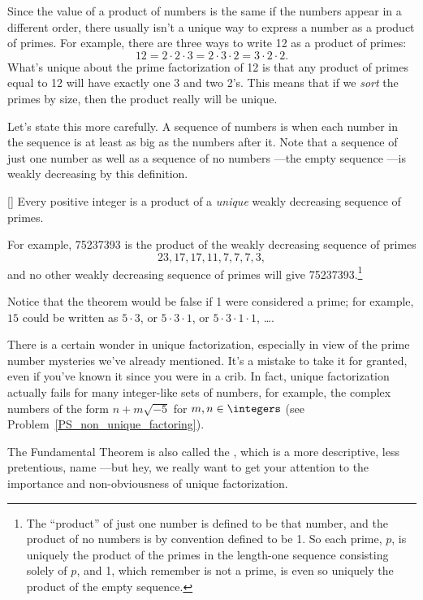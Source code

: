 Since the value of a product of numbers is the same if the numbers
appear in a different order, there usually isn't a unique way to
express a number as a product of primes.  For example, there are three
ways to write 12 as a product of primes:
\[
12 = 2 \cdot 2 \cdot 3 = 2 \cdot 3 \cdot 2 = 3 \cdot 2 \cdot 2.
\]
What's unique about the prime factorization of 12 is that any product
of primes equal to 12 will have exactly one 3 and two 2's.  This means
that if we \emph{sort} the primes by size, then the product really
will be unique.

Let's state this more carefully.  A sequence of numbers is
\emph{} when each number in the sequence is at
least as big as the numbers after it.  Note that a sequence of just
one number as well as a sequence of no numbers ---the empty sequence
---is weakly decreasing by this definition.

\begin{theorem}\label{thm:unique_factor}[]
Every positive integer is a product of a \emph{unique} weakly
decreasing sequence of primes.
\end{theorem}

For example, 75237393 is the product of the weakly decreasing sequence
of primes
\[
23, 17, 17, 11, 7, 7, 7, 3,
\]
and no other weakly decreasing sequence of primes will give
75237393.\footnote{The ``product'' of just one number is defined to be
  that number, and the product of no numbers is by convention defined
  to be 1.  So each prime, $p$, is uniquely the product of the primes
  in the length-one sequence consisting solely of $p$, and 1, which
  remember is not a prime, is even so uniquely the product of the
  empty sequence.}

Notice that the theorem would be false if 1 were considered a prime;
for example, $15$ could be written as $5 \cdot 3$, or $5 \cdot 3 \cdot
1$, or $5 \cdot 3 \cdot 1 \cdot 1$, \dots.

There is a certain wonder in unique factorization, especially in view
of the prime number mysteries we've already mentioned.  It's a mistake
to take it for granted, even if you've known it since you were in a
crib.  In fact, unique factorization actually fails for many
integer-like sets of numbers, for example, the complex numbers of the
form $n + m\sqrt{-5}$ for $m,n \in \integers$ (see
Problem~\ref{PS_non_unique_factoring}).

The Fundamental Theorem is also called the , which is a more descriptive, less pretentious, name ---but
hey, we really want to get your attention to the importance and
non-obviousness of unique factorization.


